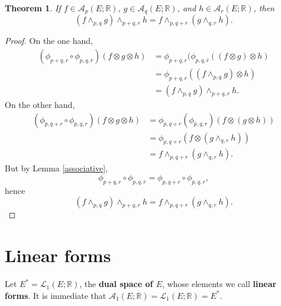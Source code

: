 \documentclass{amsart}
\newtheorem{theorem}{Theorem}
\theoremstyle{definition}
\begin{document}
\begin{theorem}
If $f \in \mathscr{A}_p(E;\mathbb{R})$, $g \in \mathscr{A}_q(E;\mathbb{R})$,
and $h \in \mathscr{A}_r(E;\mathbb{R})$, then 
\[
(f \wedge_{p,q} g) \wedge_{p+q,r} h = f \wedge_{p,q+r} (g \wedge_{q,r} h).
\]
\end{theorem}
\begin{proof}
On the one hand,
\begin{align*}
(\phi_{p+q,r} \circ \phi_{p,q,\overline{r}})(f \otimes g \otimes h)&=\phi_{p+q,r}(\phi_{p,q,\overline{r}}((f \otimes g) \otimes h)\\
&=\phi_{p+q,r}((f \wedge_{p,q} g) \otimes h)\\
&=(f \wedge_{p,q} g) \wedge_{p+q,r} h.
\end{align*}
On the other hand,
\begin{align*}
(\phi_{p,q+r} \circ \phi_{\overline{p},q,r})(f \otimes g \otimes h)&=\phi_{p,q+r}(\phi_{\overline{p},q,r})(f \otimes (g \otimes h))\\
&=\phi_{p,q+r}(f \otimes (g \wedge_{q,r} h))\\
&=f \wedge_{p,q+r} (g \wedge_{q,r} h).
\end{align*}
But by Lemma \ref{associative}, 
\[
\phi_{p+q,r} \circ \phi_{p,q,\overline{r}} = \phi_{p,q+r} \circ \phi_{\overline{p},q,r},
\]
hence
\[
(f \wedge_{p,q} g) \wedge_{p+q,r} h = f \wedge_{p,q+r} (g \wedge_{q,r} h).
\]
\end{proof}



\section{Linear forms}
Let $E^* = \mathscr{L}_1(E;\mathbb{R})$, the \textbf{dual space of $E$}, whose elements we call \textbf{linear forms}.
It is immediate that $\mathscr{A}_1(E;\mathbb{R}) = \mathscr{L}_1(E;\mathbb{R})=E^*$.
\end{document}
